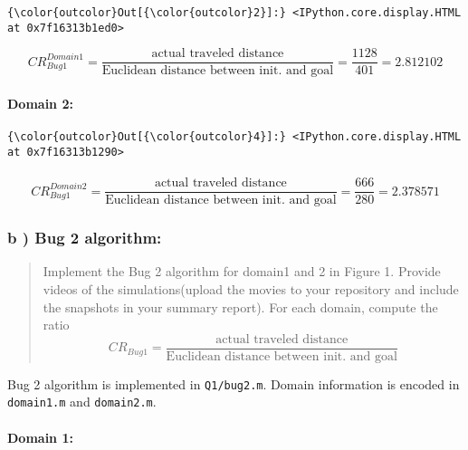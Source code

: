 \documentclass{article}
\begin{document}
            \begin{Verbatim}[commandchars=\\\{\}]
{\color{outcolor}Out[{\color{outcolor}2}]:} <IPython.core.display.HTML at 0x7f16313b1ed0>
\end{Verbatim}
        
    \[{CR}_{Bug1}^{Domain1} = \frac{\mbox{actual traveled distance}}{\mbox{Euclidean distance between init. and goal}} = \frac{1128}{401} = 2.812102\]


    \paragraph{Domain 2:}



            \begin{Verbatim}[commandchars=\\\{\}]
{\color{outcolor}Out[{\color{outcolor}4}]:} <IPython.core.display.HTML at 0x7f16313b1290>
\end{Verbatim}
        

    \paragraph{\[{CR}_{Bug1}^{Domain2} = \frac{\mbox{actual traveled distance}}{\mbox{Euclidean distance between init. and goal}} = \frac{666}{280} = 2.378571\]}



    \subsubsection{b ) Bug 2 algorithm:}


    \begin{quote}
Implement the Bug 2 algorithm for domain1 and 2 in Figure 1. Provide
videos of the simulations(upload the movies to your repository and
include the snapshots in your summary report). For each domain, compute
the ratio
\[{CR}_{Bug1} = \frac{\mbox{actual traveled distance}}{\mbox{Euclidean distance between init. and goal}}\]
\end{quote}

    Bug 2 algorithm is implemented in \texttt{Q1/bug2.m}. Domain information
is encoded in \texttt{domain1.m} and \texttt{domain2.m}.


    \paragraph{Domain 1:}
\end{document}
